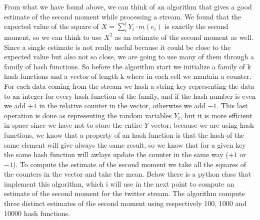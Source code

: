 \documentclass{article}
\begin{document}
From what we have found above, we can think of an algorithm that gives a good estimate of the second moment while processing a stream.
We found that the expected value of the square of $ X = \sum_{i}^{l} Y_{i} \cdot m(e_i) $ is exactly the second moment, so we can think to use $X^2$ as an estimate of the second moment as well. Since a single estimate is not really useful because it could be close to the expected value but also not so close, we are going to use many of them through a family of hash functions. So before the algorithm start we initialize a family of k hash functions and a vector of length k where in each cell we mantain a counter. For each data coming from the stream we hash a string key representing the data to an integer for every hash function of the family, and if the hash number is even we add $+1$ in the relative counter in the vector, otherwise we add $-1$. This last operation is done as representing the random variables $Y_i$, but it is more efficient in space since we have not to store the entire $Y$ vector; because we are using hash functions, we know that a property of an hash function is that the hash of the same element will give always the same result, so we know that for a given key the same hash function will awlays update the counter in the same way ($+1$ or $-1$).
To compute the estimate of the second moment we take all the squares of the counters in the vector and take the mean. Below there is a python class that implement this algorithm, which i will use in the next point to compute an estimate of the second moment for the twitter stream. The algorithm compute three distinct estimates of the second moment using respectively 100, 1000 and 10000 hash functions.

\clearpage
\end{document}
